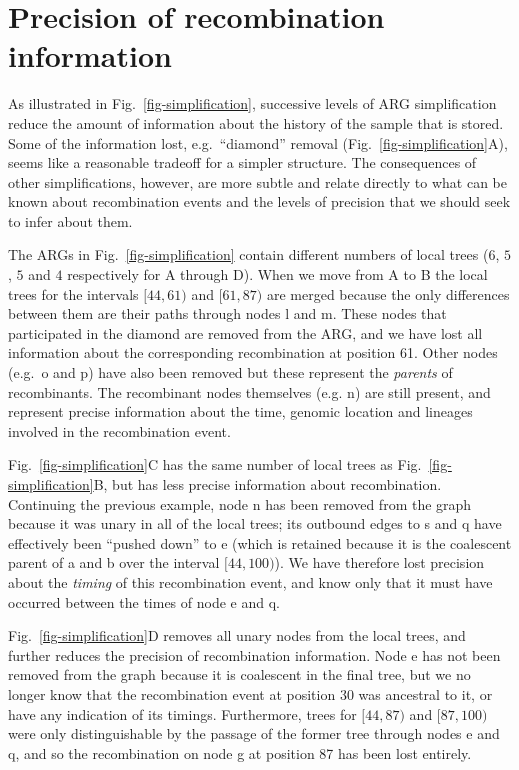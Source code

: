 \documentclass{article}
\newcommand{\noderef}[1]{\textsf{#1}}
\begin{document}
\section{Precision of recombination information}
\label{sec-precision}
As illustrated in Fig.~\ref{fig-simplification}, successive levels
of ARG simplification reduce the amount of information about the
history of the sample that is stored. Some of the information lost,
e.g.\ ``diamond'' removal (Fig.~\ref{fig-simplification}A),
seems like a reasonable tradeoff for a simpler structure.
The consequences of other simplifications, however, are
more subtle and relate directly to what can be known about
recombination events and the levels of precision that
we should seek to infer about them.

The ARGs in Fig.~\ref{fig-simplification} contain different
numbers of local trees ($6$, $5$, $5$ and $4$ respectively for A through
D). When we move from A to B the local trees
for the intervals $[44,61)$ and $[61,87)$ are merged because
the only differences between them are their paths through
nodes \noderef{l} and \noderef{m}. These nodes that participated
in the diamond are removed from the ARG, and we have lost
all information about the corresponding recombination at
position 61. Other nodes (e.g.\ \noderef{o} and \noderef{p})
have also been removed but these represent the \emph{parents}
of recombinants. The recombinant nodes themselves
(e.g. \noderef{n}) are still present, and represent precise
information about the time, genomic location and
lineages involved in the recombination event.

Fig.~\ref{fig-simplification}C has the same number of local trees
as Fig.~\ref{fig-simplification}B, but has less precise information
about recombination. Continuing the previous example, node
\noderef{n} has been removed from the graph because it was unary
in all of the local trees; its outbound edges to \noderef{s}
and \noderef{q} have effectively been ``pushed down''
to \noderef{e} (which is retained because it is the coalescent
parent of \noderef{a} and \noderef{b} over the interval
$[44, 100)$). We
have therefore lost precision about
the \emph{timing} of this recombination event, and know only
that it must have occurred between the times of node \noderef{e}
and \noderef{q}.

Fig.~\ref{fig-simplification}D removes all unary nodes from the
local trees, and further reduces the precision of
recombination information. Node \noderef{e} has not been
removed from the graph because it is coalescent in the
final tree, but we no longer know that the recombination
event at position 30 was ancestral to it, or have
any indication of its timings. Furthermore,
trees for $[44, 87)$ and $[87, 100)$ were only distinguishable
by the passage of the former tree through nodes \noderef{e}
and \noderef{q}, and so the recombination on node \noderef{g}
at position 87 has been lost entirely.
\end{document}
